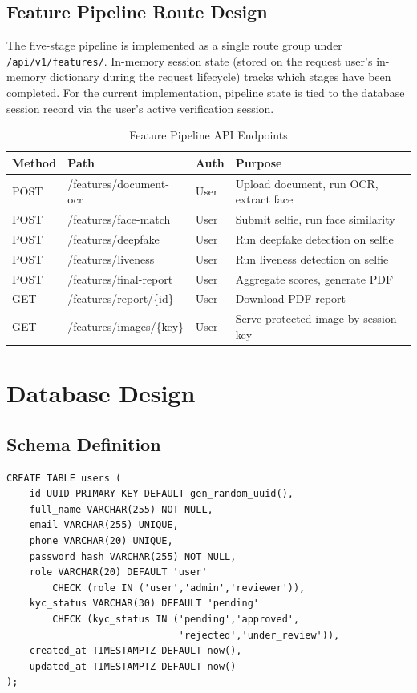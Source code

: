 \subsection{Feature Pipeline Route Design}

The five-stage pipeline is implemented as a single route group under \texttt{/api/v1/features/}. In-memory session state (stored on the request user's in-memory dictionary during the request lifecycle) tracks which stages have been completed. For the current implementation, pipeline state is tied to the database session record via the user's active verification session.

\begin{table}[H]
\centering
\caption{Feature Pipeline API Endpoints}
\begin{tabular}{@{}lllp{5cm}@{}}
\toprule
\textbf{Method} & \textbf{Path} & \textbf{Auth} & \textbf{Purpose} \\
\midrule
POST & /features/document-ocr & User & Upload document, run OCR, extract face \\
POST & /features/face-match & User & Submit selfie, run face similarity \\
POST & /features/deepfake & User & Run deepfake detection on selfie \\
POST & /features/liveness & User & Run liveness detection on selfie \\
POST & /features/final-report & User & Aggregate scores, generate PDF \\
GET & /features/report/\{id\} & User & Download PDF report \\
GET & /features/images/\{key\} & User & Serve protected image by session key \\
\bottomrule
\end{tabular}
\end{table}

\section{Database Design}

\subsection{Schema Definition}

\begin{lstlisting}[style=sqlstyle, caption=User Table DDL]
CREATE TABLE users (
    id UUID PRIMARY KEY DEFAULT gen_random_uuid(),
    full_name VARCHAR(255) NOT NULL,
    email VARCHAR(255) UNIQUE,
    phone VARCHAR(20) UNIQUE,
    password_hash VARCHAR(255) NOT NULL,
    role VARCHAR(20) DEFAULT 'user'
        CHECK (role IN ('user','admin','reviewer')),
    kyc_status VARCHAR(30) DEFAULT 'pending'
        CHECK (kyc_status IN ('pending','approved',
                              'rejected','under_review')),
    created_at TIMESTAMPTZ DEFAULT now(),
    updated_at TIMESTAMPTZ DEFAULT now()
);
\end{lstlisting}

